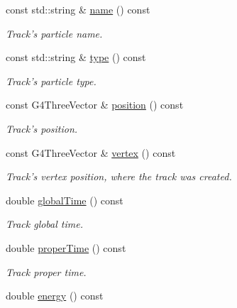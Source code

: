 \begin{DoxyCompactItemize}
const std::string \& \hyperlink{class_d_d4hep_1_1_simulation_1_1_geant4_track_handler_acf7fba0ed0fc7a6074ddb00899b94aae}{name} () const 
\begin{DoxyCompactList}\small\item\em Track's particle name. \item\end{DoxyCompactList}\item 
const std::string \& \hyperlink{class_d_d4hep_1_1_simulation_1_1_geant4_track_handler_a9083ce32805aafb9f95d1bdf53cfc440}{type} () const 
\begin{DoxyCompactList}\small\item\em Track's particle type. \item\end{DoxyCompactList}\item 
const G4ThreeVector \& \hyperlink{class_d_d4hep_1_1_simulation_1_1_geant4_track_handler_ad859295b60042a38265402f242442bd7}{position} () const 
\begin{DoxyCompactList}\small\item\em Track's position. \item\end{DoxyCompactList}\item 
const G4ThreeVector \& \hyperlink{class_d_d4hep_1_1_simulation_1_1_geant4_track_handler_a2cfe782eee6aa47c77510395f5fe65f4}{vertex} () const 
\begin{DoxyCompactList}\small\item\em Track's vertex position, where the track was created. \item\end{DoxyCompactList}\item 
double \hyperlink{class_d_d4hep_1_1_simulation_1_1_geant4_track_handler_a898c62c8e1639fd059d8dfd97fecf2d1}{globalTime} () const 
\begin{DoxyCompactList}\small\item\em Track global time. \item\end{DoxyCompactList}\item 
double \hyperlink{class_d_d4hep_1_1_simulation_1_1_geant4_track_handler_a13a89fbc1343bbb75d0a77386f8cfc65}{properTime} () const 
\begin{DoxyCompactList}\small\item\em Track proper time. \item\end{DoxyCompactList}\item 
double \hyperlink{class_d_d4hep_1_1_simulation_1_1_geant4_track_handler_a99dc1b9082ce4f63fa2501010c3b4a4e}{energy} () const 

\end{DoxyCompactItemize}
